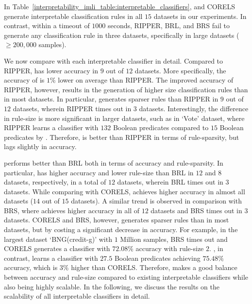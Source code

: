 In Table~\ref{interpretability_imli_table:interpretable_classifiers}, {\imli} and CORELS generate interpretable classification rules in all $ 15 $ datasets in our experiments. In contrast, within a timeout of $ 1000 $ seconds, RIPPER, BRL, and BRS fail to generate any classification rule in three datasets,  specifically in large datasets ($ \ge 200,000 $ samples). 



We now compare {\imli} with each interpretable classifier in detail. Compared to RIPPER, {\imli} has lower accuracy in $ 9 $ out  of $ 12 $ datasets. More specifically, the accuracy of {\imli} is $ 1\% $ lower on average than RIPPER. The improved accuracy of RIPPER, however, results in the generation of higher size classification rules than {\imli} in most datasets. In particular, {\imli} generates sparser rules than RIPPER in $ 9 $ out of $ 12 $ datasets, wherein RIPPER times out in $ 3 $ datasets. Interestingly, the difference in rule-size is more significant in larger datasets, such as in `Vote' dataset, where RIPPER learns a classifier with $ 132 $ Boolean predicates compared to $ 15 $ Boolean predicates by {\imli}.  Therefore, {\imli} is better than RIPPER in terms of rule-sparsity, but lags slightly in accuracy.


{\imli} performs better than BRL both in terms of accuracy and rule-sparsity. In particular, {\imli} has  higher accuracy and lower rule-size than BRL in $ 12 $ and $ 8 $ datasets, respectively, in a total of $ 12 $ datasets, wherein BRL times out in $ 3 $ datasets.  While comparing with CORELS, {\imli} achieves higher accuracy in almost all datasets ($ 14 $ out of $ 15 $ datasets). A similar trend is observed in comparison with BRS, where {\imli} achieves higher accuracy in all of $ 12 $ datasets and BRS times out in $ 3 $ datasets. CORELS and BRS, however, generates sparser rules than {\imli} in most datasets, but by costing a significant decrease in accuracy.  For example, in the largest dataset `BNG(credit-g)' with $ 1 $ Million samples, BRS times out and CORELS generates a classifier with  $ 72.08\% $ accuracy with rule-size $ 2 $. {\imli}, in contrast, learns a classifier with $ 27.5 $ Boolean predicates achieving $ 75.48\% $ accuracy, which is $ 3\% $ higher than CORELS. Therefore, {\imli}  makes a good balance between accuracy and rule-size compared to existing interpretable classifiers while also being highly scalable. In the following, we discuss the results on the scalability of all interpretable classifiers in detail. 



